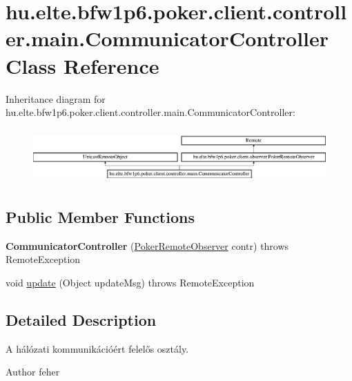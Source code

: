 \hypertarget{classhu_1_1elte_1_1bfw1p6_1_1poker_1_1client_1_1controller_1_1main_1_1_communicator_controller}{}\section{hu.\+elte.\+bfw1p6.\+poker.\+client.\+controller.\+main.\+Communicator\+Controller Class Reference}
\label{classhu_1_1elte_1_1bfw1p6_1_1poker_1_1client_1_1controller_1_1main_1_1_communicator_controller}
Inheritance diagram for hu.\+elte.\+bfw1p6.\+poker.\+client.\+controller.\+main.\+Communicator\+Controller\+:\begin{figure}[H]
\begin{center}
\leavevmode
\includegraphics[height=2.094763cm]{classhu_1_1elte_1_1bfw1p6_1_1poker_1_1client_1_1controller_1_1main_1_1_communicator_controller}
\end{center}
\end{figure}
\subsection*{Public Member Functions}
\begin{DoxyCompactItemize}
\item 
\hypertarget{classhu_1_1elte_1_1bfw1p6_1_1poker_1_1client_1_1controller_1_1main_1_1_communicator_controller_a82a7a10e53a56adccec24dc93695c5de}{}{\bfseries Communicator\+Controller} (\hyperlink{interfacehu_1_1elte_1_1bfw1p6_1_1poker_1_1client_1_1observer_1_1_poker_remote_observer}{Poker\+Remote\+Observer} contr)  throws Remote\+Exception \label{classhu_1_1elte_1_1bfw1p6_1_1poker_1_1client_1_1controller_1_1main_1_1_communicator_controller_a82a7a10e53a56adccec24dc93695c5de}

\item 
void \hyperlink{classhu_1_1elte_1_1bfw1p6_1_1poker_1_1client_1_1controller_1_1main_1_1_communicator_controller_ace58d34882787c4441266fe6c907b92b}{update} (Object update\+Msg)  throws Remote\+Exception 
\end{DoxyCompactItemize}


\subsection{Detailed Description}
A hálózati kommunikációért felelős osztály. \begin{DoxyAuthor}{Author}
feher 
\end{DoxyAuthor}


